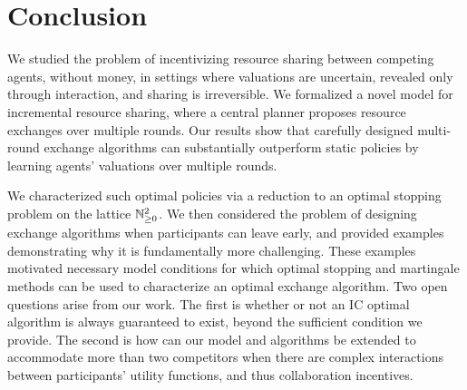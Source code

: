 \section{Conclusion}
\label{sec:conclusion}

We studied the problem of incentivizing resource sharing between competing agents, without money, in settings where valuations are uncertain, 
revealed only through interaction, and sharing is irreversible. We formalized a novel model for incremental resource sharing, 
where a central planner proposes resource exchanges over multiple rounds. Our results show that carefully designed multi-round exchange 
algorithms can substantially outperform static policies by learning agents' valuations over multiple rounds. 

We characterized 
such optimal policies via a reduction to an optimal stopping problem on the lattice $\mathbb{N}^2_{\geq 0}$. 
We then considered the problem of designing exchange algorithms when participants can leave early, and provided examples 
demonstrating why it is fundamentally more challenging.
These examples motivated necessary model conditions for which
optimal stopping and martingale methods can be used to characterize an optimal exchange algorithm.
Two open questions arise from our work. 
The first is whether or not an IC optimal algorithm is always guaranteed to exist, beyond the sufficient condition
we provide.
The second is how can our model and algorithms be extended to accommodate more than two competitors when there are complex interactions
between participants' utility functions, and thus collaboration incentives.



    
